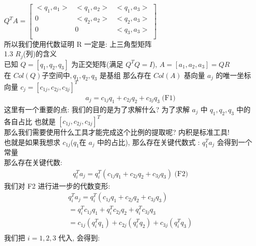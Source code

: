 \documentclass[12pt]{article}
\begin{document}
\begin{flushleft}
    $Q^{T}A = \begin{bmatrix}
            <q_{1},a_{1}> & <q_{1},a_{2}> & <q_{1},a_{3}> \\
            0             & <q_{2},a_{2}> & <q_{2},a_{3}> \\
            0             & 0             & <q_{3},a_{3}> \\
        \end{bmatrix}$ \\
    所以我们使用代数证明 R 一定是: 上三角型矩阵 \\

    1.3 $R_{j}$(列)的含义 \\
    已知 $Q = [q_{1}, q_{2}, q_{3}]$ 为正交矩阵(满足 $Q^{T}Q = I$), $A = [a_{1}, a_{2}, a_{3}] = QR$ \\
    在 $Col(Q) 子空间中, q_{1}, q_{2}, q_{3}$ 是基组 那么存在 $Col(A)$ 基向量 $a_{j}$ 的唯一坐标向量 $c_{j} = [c_{1j}, c_{2j}, c_{3j}]^{T}$ \\
    \begin{align}
        a_{j} = c_{1j}q_{1} + c_{2j}q_{2} + c_{3j}q_{3} \; \text{(F1)}
    \end{align}
    这里有一个重要的点: 我们的目的是为了求解什么?  为了求解 $a_{j}$ 中 $q_{1},q_{2},q_{3}$ 中的各自占比 也就是 $[c_{1j}, c_{2j}, c_{3j}]^{T}$ \\
    那么我们需要使用什么工具才能完成这个比例的提取呢? 内积是标准工具! \\
    也就是如果我想求 $c_{1j}$($q_{1}$在 $a_{j}$ 中的占比), 那么存在关键代数式 : $q_{1}^{T}a_{j}$ 会得到一个常量\\
    那么存在关键代数: \\
    \begin{align}
        q_{i}^{T}a_{j} = q_{i}^{T}(c_{1j}q_{1} + c_{2j}q_{2} + c_{3j}q_{3}) \; \text{(F2)}
    \end{align}
    我们对 F2 进行进一步的代数变形:\\
    \begin{align}
        q_{i}^{T}a_{j} = q_{i}^{T}(c_{1j}q_{1} + c_{2j}q_{2} + c_{3j}q_{3})        \\
        = q_{i}^{T}c_{1j}q_{1} + q_{i}^{T}c_{2j}q_{2} + q_{i}^{T}c_{3j}q_{3}       \\
        = c_{1j}(q_{i}^{T}q_{1}) + c_{2j}(q_{i}^{T}q_{2}) + c_{3j}(q_{i}^{T}q_{3}) \\
    \end{align}
    我们把 $i = 1, 2, 3$ 代入, 会得到: \\
    \begin{align}

\end{align}
\end{flushleft}
\end{document}
